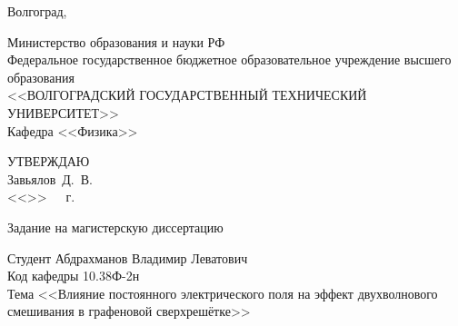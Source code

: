 \begin{titlepage}
    \begin{center}
        Волгоград, \the\year
    \end{center}
    \newpage
    \thispagestyle{empty}
    \begin{center}
       Министерство образования и науки РФ\\
    Федеральное государственное бюджетное образовательное учреждение высшего образования\\
    <<ВОЛГОГРАДСКИЙ ГОСУДАРСТВЕННЫЙ ТЕХНИЧЕСКИЙ УНИВЕРСИТЕТ>>\\
        \vspace{.5cm}
        Кафедра <<Физика>>
    \end{center}
    \vspace{1cm}
    \begin{flushright}
        \sbox{}%
        \begin{minipage}{\wd\tmp}
        \begin{center}
        УТВЕРЖДАЮ\\
        \vspace{.3cm}
        \box\tmp
        \vspace{.3cm}
        \hrulefill\hspace{1em}Завьялов~Д.~В.\\
        \vspace{.3cm}
        <<\underline{\hspace{.5cm}}>>~\underline{\hspace{3cm}}~\the\year~г.
        \end{center}
        \end{minipage}
    \end{flushright}
    \vspace{1cm}
    \begin{center}
       Задание на магистерскую диссертацию
    \end{center}
    \vspace{.5cm}
    \begin{flushleft}
        Студент Абдрахманов Владимир Леватович\\
        \vspace{.5cm}
        Код кафедры 10.38 Ф-2н\\
        \vspace{.5cm}
        Тема <<Влияние постоянного электрического поля на эффект двухволнового смешивания в графеновой сверхрешётке>>\\
        \vspace{.3cm}

\end{flushleft}
\end{titlepage}
